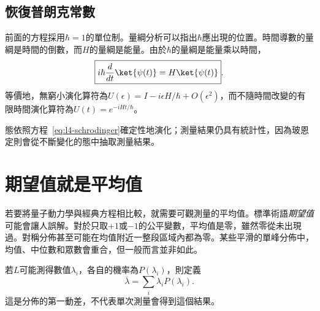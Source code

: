 \subsection{恢復普朗克常數}

前面的方程採用\(\hbar=1\)的單位制。量綱分析可以指出\(\hbar\)應出現的位置。時間導數的量綱是時間的倒數，而\(H\)的量綱是能量。由於\(\hbar\)的量綱是能量乘以時間，
\begin{equation}
\boxed{i\hbar\frac{d}{dt}\ket{\psi(t)}=H\ket{\psi(t)}}.
\label{eq:l4-schrodinger}
\end{equation}
等價地，無窮小演化算符為\(U(\epsilon)=I-i\epsilon H/\hbar+O(\epsilon^2)\)，而不隨時間改變的有限時間演化算符為\(U(t)=e^{-iHt/\hbar}\)。

\begin{classroomqa}
\end{classroomqa}

態依照方程~\eqref{eq:l4-schrodinger}確定性地演化；測量結果仍具有統計性，因為玻恩定則會從不斷變化的態中抽取測量結果。

\begin{classroomqa}
\end{classroomqa}

\section{期望值就是平均值}

若要將量子動力學與經典方程相比較，就需要可觀測量的平均值。標準術語\emph{期望值}可能會讓人誤解。對於只取\(+1\)或\(-1\)的公平變數，平均值是零，雖然零從未出現過。對稱分佈甚至可能在均值附近一整段區域內都為零。某些平滑的單峰分佈中，均值、中位數和眾數會重合，但一般而言並非如此。

若\(L\)可能測得數值\(\lambda_i\)，各自的機率為\(P(\lambda_i)\)，則定義
\begin{equation}
\overline{\lambda}=\sum_i\lambda_iP(\lambda_i).
\label{eq:l4-probability-average}
\end{equation}
這是分佈的第一動差，不代表單次測量會得到這個結果。

